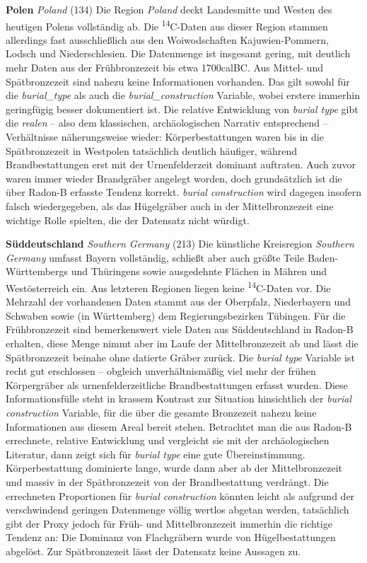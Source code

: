 \documentclass[openany,twoside,twocolumn]{book}
\begin{document}
\textbf{Polen} \emph{Poland} (134) \newline  Die Region \emph{Poland}
deckt Landesmitte und Westen des heutigen Polens vollständig ab. Die
\textsuperscript{14}C-Daten aus dieser Region stammen allerdings fast
ausschließlich aus den Woiwodschaften Kajuwien-Pommern, Lodsch und
Niederschlesien. Die Datenmenge ist insgesamt gering, mit deutlich mehr
Daten aus der Frühbronzezeit bis etwa 1700calBC. Aus Mittel- und
Spätbronzezeit sind nahezu keine Informationen vorhanden. Das gilt
sowohl für die \emph{burial\_type} als auch die
\emph{burial\_construction} Variable, wobei erstere immerhin geringfügig
besser dokumentiert ist. Die relative Entwicklung von \emph{burial type}
gibt die \emph{realen} -- also dem klassischen, archäologischen Narrativ
entsprechend -- Verhältnisse näherungsweise wieder: Körperbestattungen
waren bis in die Spätbronzezeit in Westpolen tatsächlich deutlich
häufiger, während Brandbestattungen erst mit der Urnenfelderzeit
dominant auftraten. Auch zuvor waren immer wieder Brandgräber angelegt
worden, doch grundsätzlich ist die über Radon-B erfasste Tendenz
korrekt. \emph{burial construction} wird dagegen insofern falsch
wiedergegeben, als das Hügelgräber auch in der Mittelbronzezeit eine
wichtige Rolle spielten, die der Datensatz nicht würdigt.

\textbf{Süddeutschland} \emph{Southern Germany} (213) \newline  Die
künstliche Kreisregion \emph{Southern Germany} umfasst Bayern
vollständig, schließt aber auch größte Teile Baden-Württembergs und
Thüringens sowie ausgedehnte Flächen in Mähren und Westösterreich ein.
Aus letzteren Regionen liegen keine \textsuperscript{14}C-Daten vor. Die
Mehrzahl der vorhandenen Daten stammt aus der Oberpfalz, Niederbayern
und Schwaben sowie (in Württemberg) dem Regierungsbezirken Tübingen. Für
die Frühbronzezeit sind bemerkenswert viele Daten aus Süddeutschland in
Radon-B erhalten, diese Menge nimmt aber im Laufe der Mittelbronzezeit
ab und lässt die Spätbronzezeit beinahe ohne datierte Gräber zurück. Die
\emph{burial type} Variable ist recht gut erschlossen -- obgleich
unverhältnismäßig viel mehr der frühen Körpergräber als
urnenfelderzeitliche Brandbestattungen erfasst wurden. Diese
Informationsfülle steht in krassem Kontrast zur Situation hinsichtlich
der \emph{burial construction} Variable, für die über die gesamte
Bronzezeit nahezu keine Informationen aus diesem Areal bereit stehen.
Betrachtet man die aus Radon-B errechnete, relative Entwicklung und
vergleicht sie mit der archäologischen Literatur, dann zeigt sich für
\emph{burial type} eine gute Übereinstimmung. Körperbestattung
dominierte lange, wurde dann aber ab der Mittelbronzezeit und massiv in
der Spätbronzezeit von der Brandbestattung verdrängt. Die errechneten
Proportionen für \emph{burial construction} könnten leicht als aufgrund
der verschwindend geringen Datenmenge völlig wertlos abgetan werden,
tatsächlich gibt der Proxy jedoch für Früh- und Mittelbronzezeit
immerhin die richtige Tendenz an: Die Dominanz von Flachgräbern wurde
von Hügelbestattungen abgelöst. Zur Spätbronzezeit lässt der Datensatz
keine Aussagen zu.
\end{document}
